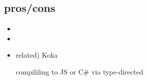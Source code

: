 \subsection*{pros/cons}
\begin{frame}
  \frametitlesubs

  \pause
  \begin{itemize}
    \item<+->[\coloremoji{😁}] 
    \item<+->[\coloremoji{😕}] 
  \end{itemize}


  \begin{itemize}
    \item<+->[\coloremoji{⭐}] related)  \alert{Koka}

      compililing to JS or C\# via type-directed ~\cite{leijen2016algebraic}
  \end{itemize}
\end{frame}
